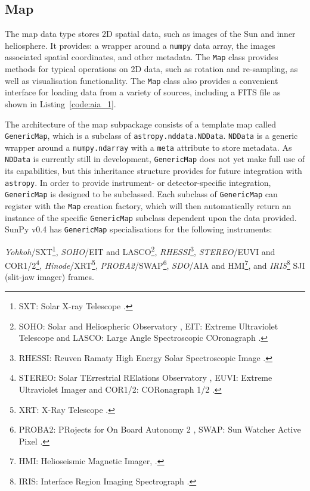 \subsection{Map}\label{ssec:map}
The map data type stores 2D spatial data, such as images of the Sun and 
inner heliosphere. It provides: a wrapper around a \texttt{numpy} data array, 
the images associated spatial coordinates, and other metadata. The \texttt{Map} 
class provides methods for typical operations on 2D data, such as rotation and 
re-sampling, as well as visualisation functionality.
The \texttt{Map} class also provides a convenient interface for loading data 
from a variety of sources, including a FITS file as shown in 
Listing~\ref{code:aia_1}.

The architecture of the map subpackage consists of a template map called
\texttt{GenericMap}, which is a subclass of \texttt{astropy.nddata.NDData}. 
\texttt{NDData} is a generic wrapper around a \texttt{numpy.ndarray} with a 
\texttt{meta} attribute to store metadata.
As \texttt{NDData} is currently still in development, \texttt{GenericMap} does 
not yet make full use of its capabilities, but this inheritance structure 
provides for future integration with \texttt{astropy}. In order to provide 
instrument- or detector-specific integration, \texttt{GenericMap} is designed
to be subclassed. Each subclass of \texttt{GenericMap} can register 
with the \texttt{Map} creation factory, which will then automatically return an instance
of the specific \texttt{GenericMap} subclass dependent upon the data provided. 
SunPy v0.4 has \texttt{GenericMap} specialisations for the following 
instruments: 

\textit{Yohkoh}/SXT\footnote{SXT: Solar X-ray Telescope \citep{1991SoPh..136....1O, 1991SoPh..136...37T}.},
\textit{SOHO}/EIT and LASCO\footnote{SOHO: Solar and Heliospheric Observatory \citep{domingo1995}, EIT: Extreme Ultraviolet Telescope \citep{1995SoPh..162..291D} and LASCO: Large Angle Spectroscopic COronagraph \citep{1995SoPh..162..357B}.},
\textit{RHESSI}\footnote{RHESSI: Reuven Ramaty High Energy Solar Spectroscopic Image \citep{2002SoPh..210....3L}.},
\textit{STEREO}/EUVI and COR1/2\footnote{STEREO: Solar TErrestrial RElations Observatory \citep{2005AdSpR..36.1483K}, EUVI: Extreme Ultraviolet Imager \citep{2004SPIE.5171..111W} and COR1/2: CORonagraph 1/2 \citep{2002AdSpR..29.2017H}.},
\textit{Hinode}/XRT\footnote{XRT: X-Ray Telescope \citep{2007SoPh..243....3K, 2007SoPh..243...63G}.},
\textit{PROBA2}/SWAP\footnote{PROBA2: PRojects for On Board Autonomy 2 \citep{2013SoPh..286....5S}, SWAP: Sun Watcher Active Pixel \citep{2013SoPh..286...43S}.},
\textit{SDO}/AIA and HMI\footnote{HMI: Helioseismic Magnetic Imager, \citep{2012SoPh..275..207S}.}, and
\textit{IRIS}\footnote{IRIS: Interface Region Imaging Spectrograph \citep{2011SPD....42.1512L}.} SJI (slit-jaw imager) frames.
                        
